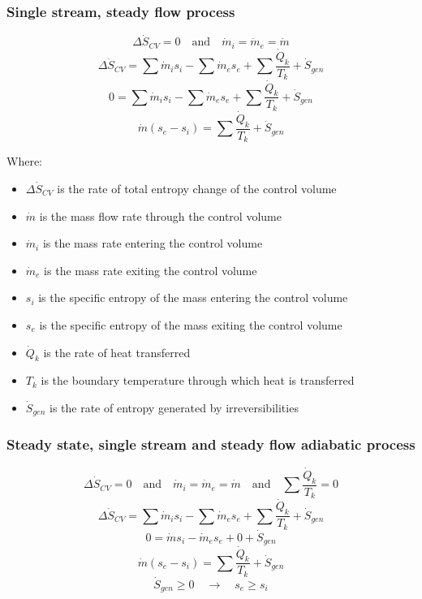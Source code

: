 \documentclass[11pt]{article}
\begin{document}
 \newpage
\subsubsection{Single stream, steady flow process}
\label{sec:orgd179dc1}
\[\Delta \dot{S}_{CV} = 0 \quad \text{and} \quad \dot{m}_i = \dot{m}_e = \dot{m}\]
\[\Delta \dot{S}_{CV} = \sum \dot{m}_i s_i - \sum \dot{m}_e s_e + \sum \frac{\dot{Q}_k}{T_k} + \dot{S}_{gen}\]
\[0 = \sum \dot{m}_i s_i - \sum \dot{m}_e s_e + \sum \frac{\dot{Q}_k}{T_k} + \dot{S}_{gen}\]
\[\dot{m} (s_e - s_i) = \sum \frac{\dot{Q}_k}{T_k} + \dot{S}_{gen}\]

Where:
\begin{itemize}
\item \(\Delta \dot{S}_{CV}\) is the rate of total entropy change of the control volume
\item \(\dot{m}\) is the mass flow rate through the control volume
\item \(\dot{m}_i\) is the mass rate entering the control volume
\item \(\dot{m}_e\) is the mass rate exiting the control volume
\item \(s_i\) is the specific entropy of the mass entering the control volume
\item \(s_e\) is the specific entropy of the mass exiting the control volume
\item \(\dot{Q}_k\) is the rate of heat transferred
\item \(T_k\) is the boundary temperature through which heat is transferred
\item \(\dot{S}_{gen}\) is the rate of entropy generated by irreversibilities
\end{itemize}

 \newpage
\subsubsection{Steady state, single stream and steady flow adiabatic process}
\label{sec:org6c6784c}
\[\Delta \dot{S}_{CV} = 0 \quad \text{and} \quad \dot{m}_i = \dot{m}_e = \dot{m} \quad \text{and} \quad \sum \frac{\dot{Q}_k}{T_k} = 0\]
\[\Delta \dot{S}_{CV} = \sum \dot{m}_i s_i - \sum \dot{m}_e s_e + \sum \frac{\dot{Q}_k}{T_k} + \dot{S}_{gen}\]
\[0 = \dot{m} s_i - \dot{m}_e s_e + 0 + \dot{S}_{gen}\]
\[\dot{m} (s_e - s_i) = \sum \frac{\dot{Q}_k}{T_k} + \dot{S}_{gen}\]
\[\dot{S}_{gen} \ge 0 \quad \rightarrow \quad s_e \ge s_i\]
\end{document}
